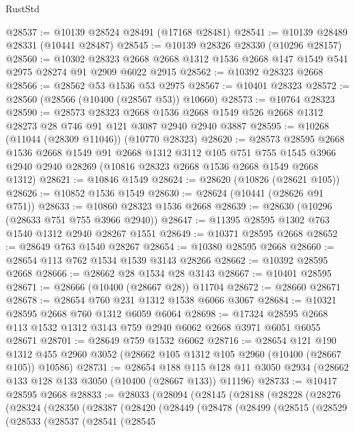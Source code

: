 \begin{lexlean}{RustStd}
\begin{coremodule}
@28537 := @10139 @28524 @28491 (@17168 @28481)
@28541 := @10139 @28489 @28331 (@10441 @28487)
@28545 := @10139 @28326 @28330 (@10296 @28157)
@28560 := @10302
    @28323
    @2668
    @2668
    @1312
    @1536
    @2668
    @147
    @1549
    @541
    @2975
    @28274
    @91
    @2909
    @6022
    @2915
@28562 := @10392 @28323 @2668
@28566 := @28562 @53 @1536 @53 @2975
@28567 := @10401 @28323
@28572 := @28560 (@28566 (@10400 (@28567 @53)) @10660)
@28573 := @10764 @28323
@28590 := @28573
    @28323
    @2668
    @1536
    @2668
    @1549
    @526
    @2668
    @1312
    @28273
    @28
    @746
    @91
    @121
    @3087
    @2940
    @2940
    @3887
@28595 := @10268 (@11044 (@28309 @11046)) (@10770 @28323)
@28620 := @28573
    @28595
    @2668
    @1536
    @2668
    @1549
    @91
    @2668
    @1312
    @3112
    @105
    @751
    @755
    @1545
    @3966
    @2940
    @2940
    @28269
    (@10816 @28323 @2668 @1536 @2668 @1549 @2668 @1312)
@28621 := @10846 @1549
@28624 := @28620 (@10826 (@28621 @105))
@28626 := @10852 @1536 @1549
@28630 := @28624 (@10441 (@28626 @91 @751))
@28633 := @10860 @28323 @1536 @2668
@28639 := @28630 (@10296 (@28633 @751 @755 @3966 @2940))
@28647 := @11395 @28595 @1302 @763 @1540 @1312 @2940 @28267 @1551
@28649 := @10371 @28595 @2668
@28652 := @28649 @763 @1540 @28267
@28654 := @10380 @28595 @2668
@28660 := @28654 @113 @762 @1534 @1539 @3143 @28266
@28662 := @10392 @28595 @2668
@28666 := @28662 @28 @1534 @28 @3143
@28667 := @10401 @28595
@28671 := @28666 (@10400 (@28667 @28)) @11704
@28672 := @28660 @28671
@28678 := @28654 @760 @231 @1312 @1538 @6066 @3067
@28684 := @10321 @28595 @2668 @760 @1312 @6059 @6064
@28698 := @17324 @28595 @2668 @113 @1532 @1312 @3143 @759 @2940 @6062 @2668 @3971 @6051 @6055 @28671
@28701 := @28649 @759 @1532 @6062
@28716 := @28654
    @121
    @190
    @1312
    @455
    @2960
    @3052
    (@28662 @105 @1312 @105 @2960 (@10400 (@28667 @105)) @10586)
@28731 := @28654
    @188
    @115
    @128
    @11
    @3050
    @2934
    (@28662 @133 @128 @133 @3050 (@10400 (@28667 @133)) @11196)
@28733 := @10417 @28595 @2668
@28833 := @28033
    (@28094
      (@28145
        (@28188
          (@28228
            (@28276
              (@28324
                (@28350
                  (@28387
                    (@28420
                      (@28449
                        (@28478
                          (@28499
                            (@28515
                              (@28529
                                (@28533
                                  (@28537
                                    (@28541
                                      (@28545

\end{coremodule}
\end{lexlean}
